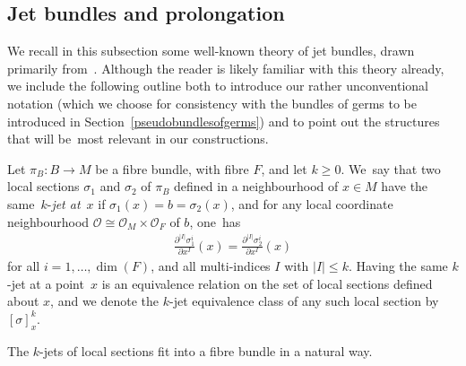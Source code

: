 \documentclass[pdftex]{sigma}
\numberwithin{equation}{section}
\def\OO{{\mathcal{O}}}
\begin{document}
\subsection{Jet bundles and prolongation}

We recall in this subsection some well-known theory of jet bundles, drawn primarily from~\cite{varbi, saunders}. Although the reader is likely familiar with this theory already, we include the following outline both to introduce our rather unconventional notation (which we choose for consistency with the bundles of germs to be introduced in Section~\ref{pseudobundlesofgerms}) and to point out the structures that will be~most relevant in our constructions.

\begin{Definition}
Let $\pi_{B}\colon B\rightarrow M$ be a fibre bundle, with fibre $F$, and let $k\geq0$. We~say that two local sections $\sigma_{1}$ and $\sigma_{2}$ of $\pi_{B}$ defined in a neighbourhood of $x\in M$ have the same~$k$-\textit{jet at}~$x$ if $\sigma_{1}(x) =b= \sigma_{2}(x)$, and for any local coordinate neighbourhood $\OO\cong\OO_{M}\times\OO_{F}$ of $b$, one~has
\begin{gather*}
\frac{\partial^{|I|}\sigma^{i}_{1}}{\partial x^{I}}(x) = \frac{\partial^{|I|}\sigma^{i}_{2}}{\partial x^{I}}(x)
\end{gather*}
for all $i = 1,\dots,\dim(F)$, and all multi-indices $I$ with $|I|\leq k$. Having the same $k$-jet at a point~$x$ is an equivalence relation on the set of local sections defined about $x$, and we denote the $k$-jet equivalence class of any such local section by $[\sigma]^{k}_{x}$.
\end{Definition}

The $k$-jets of local sections fit into a fibre bundle in a natural way.
\end{document}
